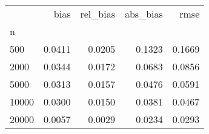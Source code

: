 \begin{tabular}{lrrrr}
\toprule
{} &   bias &  rel\_bias &  abs\_bias &   rmse \\
n     &        &           &           &        \\
\midrule
500   & 0.0411 &    0.0205 &    0.1323 & 0.1669 \\
2000  & 0.0344 &    0.0172 &    0.0683 & 0.0856 \\
5000  & 0.0313 &    0.0157 &    0.0476 & 0.0591 \\
10000 & 0.0300 &    0.0150 &    0.0381 & 0.0467 \\
20000 & 0.0057 &    0.0029 &    0.0234 & 0.0293 \\
\bottomrule
\end{tabular}
